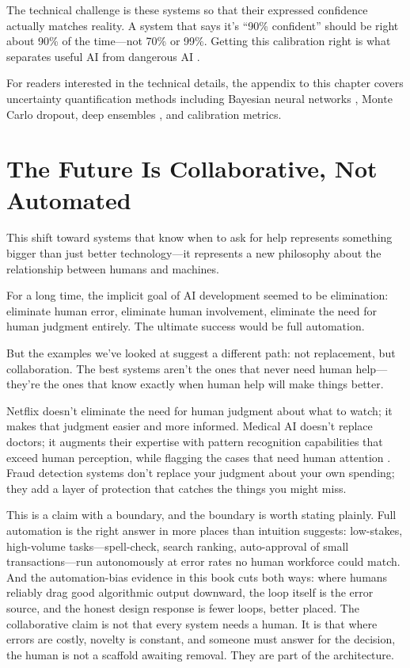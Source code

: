 The technical challenge is  these systems so that their expressed confidence actually matches reality. A system that says it's ``90\% confident'' should be right about 90\% of the time---not 70\% or 99\%. Getting this calibration right is what separates useful AI from dangerous AI \autocite{guo2017calibration}.

\begin{technote}
For readers interested in the technical details, the appendix to this chapter covers uncertainty quantification methods including Bayesian neural networks \autocite{gal2016dropout}, Monte Carlo dropout, deep ensembles \autocite{lakshminarayanan2017simple}, and calibration metrics.
\end{technote}

\section{The Future Is Collaborative, Not Automated}

This shift toward systems that know when to ask for help represents something bigger than just better technology---it represents a new philosophy about the relationship between humans and machines.

For a long time, the implicit goal of AI development seemed to be elimination: eliminate human error, eliminate human involvement, eliminate the need for human judgment entirely. The ultimate success would be full automation.

But the examples we've looked at suggest a different path: not replacement, but collaboration. The best systems aren't the ones that never need human help---they're the ones that know exactly when human help will make things better.

Netflix doesn't eliminate the need for human judgment about what to watch; it makes that judgment easier and more informed. Medical AI doesn't replace doctors; it augments their expertise with pattern recognition capabilities that exceed human perception, while flagging the cases that need human attention \autocite{kompa2021second}. Fraud detection systems don't replace your judgment about your own spending; they add a layer of protection that catches the things you might miss.

This is a claim with a boundary, and the boundary is worth stating plainly. Full automation is the right answer in more places than intuition suggests: low-stakes, high-volume tasks---spell-check, search ranking, auto-approval of small transactions---run autonomously at error rates no human workforce could match. And the automation-bias evidence in this book cuts both ways: where humans reliably drag good algorithmic output downward, the loop itself is the error source, and the honest design response is fewer loops, better placed. The collaborative claim is not that every system needs a human. It is that where errors are costly, novelty is constant, and someone must answer for the decision, the human is not a scaffold awaiting removal. They are part of the architecture.


